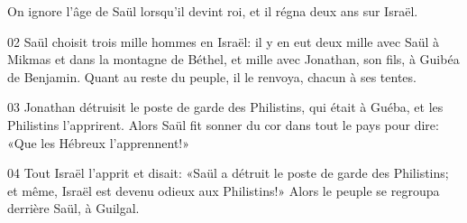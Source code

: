 On ignore l’âge de Saül lorsqu’il devint roi, et il régna deux ans sur Israël.

02 Saül choisit trois mille hommes en Israël: il y en eut deux mille avec Saül à Mikmas et dans la montagne de Béthel, et mille avec Jonathan, son fils, à Guibéa de Benjamin. Quant au reste du peuple, il le renvoya, chacun à ses tentes.

03 Jonathan détruisit le poste de garde des Philistins, qui était à Guéba, et les Philistins l’apprirent. Alors Saül fit sonner du cor dans tout le pays pour dire: «Que les Hébreux l’apprennent!»

04 Tout Israël l’apprit et disait: «Saül a détruit le poste de garde des Philistins; et même, Israël est devenu odieux aux Philistins!» Alors le peuple se regroupa derrière Saül, à Guilgal.
